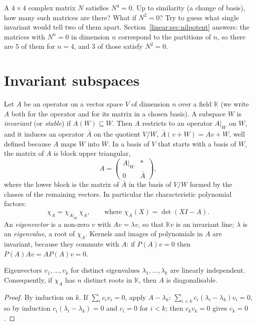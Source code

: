 \begin{think}
A $4\times4$ complex matrix $N$ satisfies $N^4=0$. Up to similarity (a change of basis), how many such matrices are
there? What if $N^2=0$? Try to guess what single invariant would tell two of them apart. Section~\ref{linear:sec:nilpotent}
answers: the matrices with $N^n=0$ in dimension $n$ correspond to the partitions of $n$, so there are $5$ of them for
$n=4$, and $3$ of those satisfy $N^2=0$.
\end{think}

\section{Invariant subspaces}

Let $A$ be an operator on a vector space $V$ of dimension $n$ over a field $\mathbb K$ (we write $A$ both for the
operator and for its matrix in a chosen basis). A subspace $W$ is \emph{invariant} (or \emph{stable}) if $A(W)\subseteq
W$. Then $A$ restricts to an operator $A|_W$ on $W$, and it induces an operator $\bar A$ on the quotient $V/W$,
$\bar A(v+W)=Av+W$, well defined because $A$ maps $W$ into $W$. In a basis of $V$ that starts with a basis of $W$, the
matrix of $A$ is block upper triangular,
\[
A=\begin{pmatrix}A|_W&*\\0&\bar A\end{pmatrix},
\]
where the lower block is the matrix of $\bar A$ in the basis of $V/W$ formed by the classes of the remaining vectors. In
particular the characteristic polynomial factors:
\begin{equation}\label{linear:eq:charfactor}
\chi_A=\chi_{A|_W}\,\chi_{\bar A},\qquad\text{where }\chi_A(X)=\det(XI-A).
\end{equation}
An \emph{eigenvector} is a non-zero $v$ with $Av=\lambda v$, so that $\mathbb Kv$ is an invariant line; $\lambda$ is an
\emph{eigenvalue}, a root of $\chi_A$. Kernels and images of polynomials in $A$ are invariant, because they commute with
$A$: if $P(A)v=0$ then $P(A)Av=AP(A)v=0$.

\begin{proposition}\label{linear:prop:indep}
Eigenvectors $v_1,\dots,v_k$ for distinct eigenvalues $\lambda_1,\dots,\lambda_k$ are linearly independent. Consequently,
if $\chi_A$ has $n$ distinct roots in $\mathbb K$, then $A$ is diagonalisable.
\end{proposition}
\begin{proof}
By induction on $k$. If $\sum_i c_iv_i=0$, apply $A-\lambda_k$: $\sum_{i<k}c_i(\lambda_i-\lambda_k)v_i=0$, so by
induction $c_i(\lambda_i-\lambda_k)=0$ and $c_i=0$ for $i<k$; then $c_kv_k=0$ gives $c_k=0$.
\end{proof}

